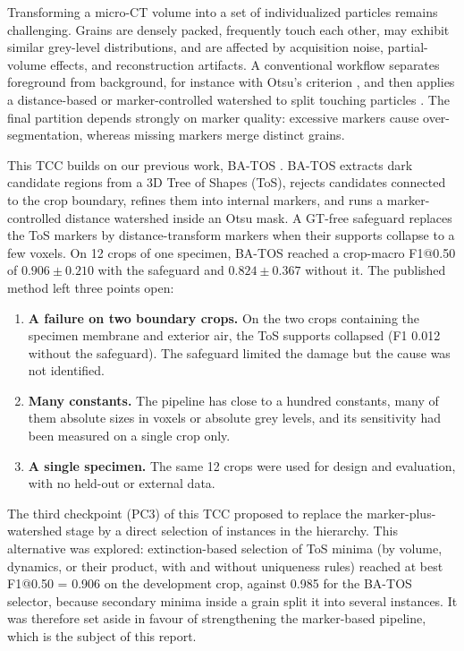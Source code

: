 \documentclass[12pt]{article}
\begin{document}
Transforming a micro-CT volume into a set of individualized particles remains challenging. Grains are densely
packed, frequently touch each other, may exhibit similar grey-level distributions, and are affected by
acquisition noise, partial-volume effects, and reconstruction artifacts. A conventional workflow separates
foreground from background, for instance with Otsu's criterion \citep{otsu1979}, and then applies a distance-based
or marker-controlled watershed to split touching particles \citep{beucher1979,soille2003}. The final partition
depends strongly on marker quality: excessive markers cause over-segmentation, whereas missing markers merge
distinct grains.

This TCC builds on our previous work, BA-TOS \citep{dias2026}. BA-TOS extracts dark candidate regions from a 3D
Tree of Shapes (ToS), rejects candidates connected to the crop boundary, refines them into internal markers, and
runs a marker-controlled distance watershed inside an Otsu mask. A GT-free safeguard replaces the ToS markers by
distance-transform markers when their supports collapse to a few voxels. On 12 crops of one specimen, BA-TOS
reached a crop-macro F1@0.50 of $0.906 \pm 0.210$ with the safeguard and $0.824 \pm 0.367$ without it. The
published method left three points open:
\begin{enumerate}
  \item \textbf{A failure on two boundary crops.} On the two crops containing the specimen membrane and exterior
        air, the ToS supports collapsed (F1 0.012 without the safeguard). The safeguard limited the damage but the
        cause was not identified.
  \item \textbf{Many constants.} The pipeline has close to a hundred constants, many of them absolute sizes in
        voxels or absolute grey levels, and its sensitivity had been measured on a single crop only.
  \item \textbf{A single specimen.} The same 12 crops were used for design and evaluation, with no held-out or
        external data.
\end{enumerate}

The third checkpoint (PC3) of this TCC proposed to replace the marker-plus-watershed stage by a direct selection of
instances in the hierarchy. This alternative was explored: extinction-based selection of ToS minima (by volume,
dynamics, or their product, with and without uniqueness rules) reached at best F1@0.50 = 0.906 on the development
crop, against 0.985 for the BA-TOS selector, because secondary minima inside a grain split it into several
instances. It was therefore set aside in favour of strengthening the marker-based pipeline, which is the subject of
this report.
\end{document}
